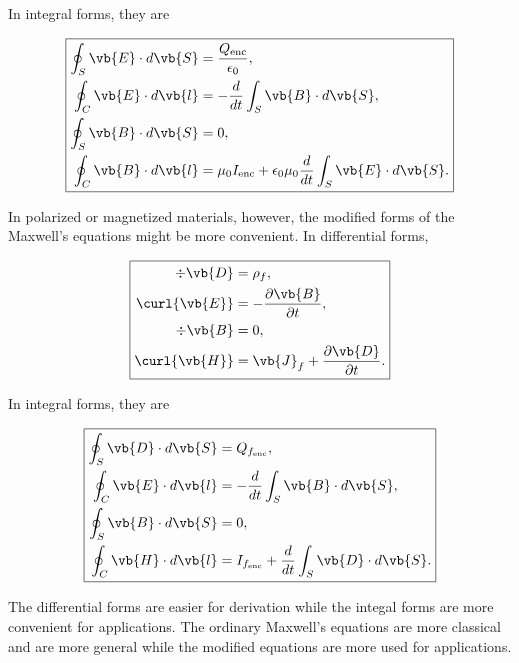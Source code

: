 \documentclass[english,a4paper,12pt]{report}
\begin{document}
In integral forms, they are 

\begin{equation}
    \boxed{
    \begin{aligned}
        \oint_{S} \vb{E} \cdot d\vb{S} &= \frac{Q_{\text{enc} } }{\epsilon_0 } ,\\
        \oint_{C} \vb{E} \cdot d\vb{l} &= - \frac{d}{dt} \int_{S}^{} \vb{B} \cdot d\vb{S}   ,\\
        \oint_{S} \vb{B} \cdot d\vb{S} &= 0 ,\\
        \oint_{C} \vb{B} \cdot d\vb{l} &= \mu_0 I_{\text{enc} } + \epsilon_0 \mu_0 \frac{d}{dt} \int_{S}^{} \vb{E} \cdot d\vb{S}     .     
    \end{aligned}}
\end{equation}

In polarized or magnetized materials, however, the modified forms of the Maxwell's equations might be more convenient. In differential forms,

\begin{equation}
    \boxed{
    \begin{aligned}
        \div{\vb{D} } &= \rho _{f},\\
        \curl{\vb{E} } &= -\frac{\partial \vb{B} }{\partial t},\\
        \div{\vb{B} } &= 0,\\
        \curl{\vb{H} } &= \vb{J} _{f} + \frac{\partial \vb{D} }{\partial t}.     
    \end{aligned}}
\end{equation}

In integral forms, they are 

\begin{equation} \label{boundary} 
    \boxed{
    \begin{aligned}
        \oint_{S} \vb{D} \cdot d\vb{S} &= Q_{f_{\text{enc} } } ,\\
        \oint_{C} \vb{E} \cdot d\vb{l} &= - \frac{d}{dt} \int_{S}^{} \vb{B} \cdot d\vb{S}   ,\\
        \oint_{S} \vb{B} \cdot d\vb{S} &= 0 ,\\
        \oint_{C} \vb{H} \cdot d\vb{l} &= I_{f_{\text{enc} } } + \frac{d}{dt} \int_{S}^{} \vb{D} \cdot d\vb{S}     .     
    \end{aligned}}
\end{equation}

The differential forms are easier for derivation while the integal forms are more convenient for applications. The ordinary Maxwell's equations are more classical and are more general while the modified equations are more used for applications.
\end{document}
